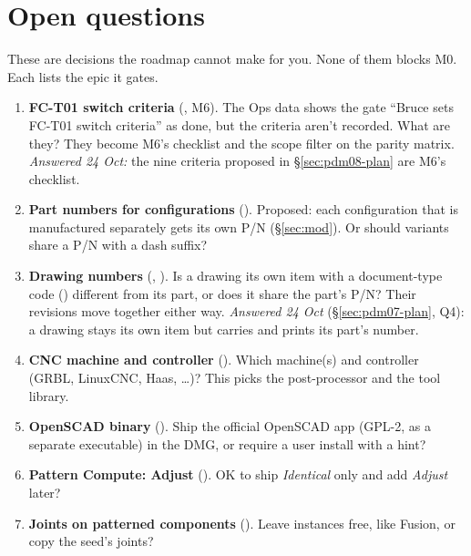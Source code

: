 \section{Open questions}\label{sec:questions}

These are decisions the roadmap cannot make for you. None of them blocks M0. Each lists the epic it gates.

\begin{enumerate}[label=Q\arabic*.,ref=Q\arabic*]
  \item\label{q:fct01} \textbf{FC-T01 switch criteria} (, M6). The Ops data shows the gate
        ``Bruce sets FC-T01 switch criteria'' as done, but the criteria aren't recorded. What are they? They
        become M6's checklist and the scope filter on the parity matrix.
        \emph{Answered 24 Oct:} the nine criteria proposed in \S\ref{sec:pdm08-plan} are M6's checklist.
  \item\label{q:cfgpn} \textbf{Part numbers for configurations} (). Proposed: each configuration
        that is manufactured separately gets its own P/N (\S\ref{sec:mod}). Or should variants share a P/N with
        a dash suffix?
  \item\label{q:dwgpn} \textbf{Drawing numbers} (, ). Is a drawing its own item with
        a document-type code () different from its part, or does it share the part's P/N? Their
        revisions move together either way.
        \emph{Answered 24 Oct} (\S\ref{sec:pdm07-plan}, Q4): a drawing stays its own item but carries and prints its
        part's number.
  \item\label{q:cnc} \textbf{CNC machine and controller} (). Which machine(s) and controller
        (GRBL, LinuxCNC, Haas, \ldots)? This picks the post-processor and the tool library.
  \item\label{q:openscad} \textbf{OpenSCAD binary} (). Ship the official OpenSCAD app (GPL-2, as a
        separate executable) in the DMG, or require a user install with a hint?
  \item\label{q:compute} \textbf{Pattern Compute: Adjust} (). OK to ship \emph{Identical} only
        and add \emph{Adjust} later?
  \item \textbf{Joints on patterned components} (). Leave instances free, like Fusion, or
        copy the seed's joints?

\end{enumerate}
